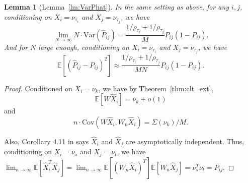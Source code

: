 \documentclass[10pt,letterpaper]{article}
\newtheorem{lemma}[fact]{Lemma}
\newcommand{\Ex}{\mathbb{E}}
\renewcommand{\hat}{\widehat}
\begin{document}
\begin{lemma}[Lemma~\ref{lm:VarPhat}]
In the same setting as above, for any $i, j$, conditioning on $X_i = \nu_{\tau_i}$ and $X_j = \nu_{\tau_j}$, we have
\[
	\lim_{N \to \infty} N \cdot \mathrm{Var}(\hat{P}_{ij}) =
    \frac{1/\rho_{\tau_i} + 1/\rho_{\tau_j}}{M} P_{ij} (1 - P_{ij}).
\]
And for $N$ large enough, conditioning on $X_i = \nu_{\tau_i}$ and $X_j = \nu_{\tau_j}$, we have
\[
	\Ex[(\hat{P}_{ij} - P_{ij})^2] \approx
    \frac{1/\rho_{\tau_i} + 1/\rho_{\tau_j}}{M N} P_{ij}(1-P_{ij}).
\]
\end{lemma}
\begin{proof}
Conditioned on $X_i = \nu_k$, we have by Theorem~\ref{thm:clt_ext},
\[
	\Ex[W \hat{X}_i] = \nu_k+o(1)
\]
and
\[
	n \cdot \mathrm{Cov}(W \hat{X}_i, W_n \hat{X}_i) = \Sigma(\nu_k)/M.
\]


Also, Corollary 4.11 in \citet{athreya2013limit} says $\hat{X}_i$ and $\hat{X}_j$ are asymptotically independent. Thus, conditioning on $X_i = \nu_s$ and $X_j = \nu_t$, we have $\lim_{n\to\infty}\Ex[\hat{X}_i^T \hat{X}_j] = \lim_{n\to\infty}\Ex[(W_n \hat{X}_i)^T] \Ex[W_n \hat{X}_j] = \nu_s^T \nu_t = P_{ij}$.


\end{proof}
\end{document}
